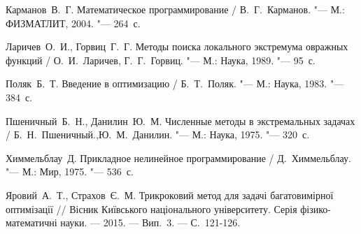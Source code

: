 \begin{thebibliography}{99}

Карманов~В.~Г. Математическое программирование / В.~Г.~Карманов. "--- М.: ФИЗМАТЛИТ, 2004. "--- 264~с.

Ларичев~О.~И., Горвиц~Г.~Г. Методы поиска локального экстремума овражных функций /
О.~И.~Ларичев, Г.~Г.~Горвиц.  "--- М.: Наука, 1989. "--- 95~с.

Поляк~Б.~Т. Введение в оптимизацию / Б.~Т.~Поляк. "--- М.: Наука, 1983. "--- 384~с.

Пшеничный~Б.~Н., Данилин~Ю.~М. Численные методы в экстремальных задачах / Б.~Н.~Пшеничный.,Ю.~М.~Данилин. "--- М.: Наука, 1975. "--- 320~с.

Химмельблау~Д. Прикладное нелинейное программирование / Д.~Химмельблау. "--- М.: Мир, 1975. "--- 536~с.

Яровий~А.~Т., Страхов~Є.~М. Трикроковий метод для задачі багатовимірної оптимізації // Вісник Київського національного університету. Серія фізико-математичні науки. --- 2015. --- Вип.~3. --- С.~121-126.

\end{thebibliography}

